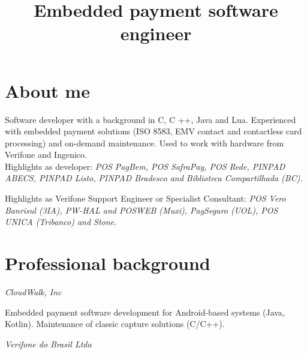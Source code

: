 \documentclass[11pt,a4paper,sans]{moderncv}
\title{\Large Embedded payment software\protect\\engineer}
\begin{document}
\maketitle

\section{About me}

\vspace{0.5mm}

\hspace{1.25cm} Software developer with a background in C, C ++, Java and Lua.
Experienced with embedded payment solutions (ISO 8583, EMV contact and
contactless card processing) and on-demand maintenance. Used to work with
hardware from Verifone and Ingenico.\protect\\

\hspace{1.25cm} Highlights as developer: \textit{POS PagBem, POS SafraPay, POS
Rede, PINPAD ABECS, PINPAD Listo, PINPAD Bradesco and Biblioteca Compartilhada
(BC).}

\hspace{1.25cm} Highlights as Verifone Support Engineer or Specialist
Consultant: \textit{POS Vero Banrisul (3IA), PW-HAL and POSWEB (Muxi),
PagSeguro (UOL), POS UNICA (Tribanco) and Stone.}

\section{Professional background}

\vspace{0.5mm}

\hspace{1.25cm} \textit{CloudWalk, Inc}


\hspace{1.25cm} \begin{minipage}[htb]{\linewidth - 1.25cm}
    Embedded payment software development for Android-based systems (Java,
    Kotlin). Maintenance of classic capture solutions (C/C++).
\end{minipage}

\vspace{\baselineskip}

\hspace{1.25cm} \textit{Verifone do Brasil Ltda}
\end{document}
